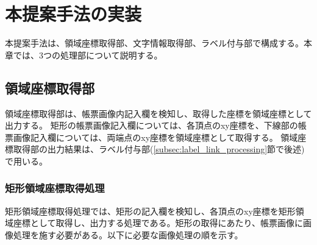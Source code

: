 \chapter{本提案手法の実装}\label{cha:Implementation}
本提案手法は、領域座標取得部、文字情報取得部、ラベル付与部で構成する。本章では、3つの処理部について説明する。


\section{領域座標取得部}\label{sec:area_coords_obtainment_part}
領域座標取得部は、帳票画像内記入欄を検知し、取得した座標を領域座標として出力する。
矩形の帳票画像記入欄については、各頂点のxy座標を、下線部の帳票画像記入欄については、両端点のxy座標を領域座標として取得する。
領域座標取得部の出力結果は、ラベル付与部(\ref{subsec:label_link_processing}節で後述)で用いる。



\subsection{矩形領域座標取得処理}\label{subsec:rect_coords_obtainment_processing}
矩形領域座標取得処理では、矩形の記入欄を検知し、各頂点のxy座標を矩形領域座標として取得し、出力する処理である。矩形の取得にあたり、帳票画像に画像処理を施す必要がある。以下に必要な画像処理の順を示す。

